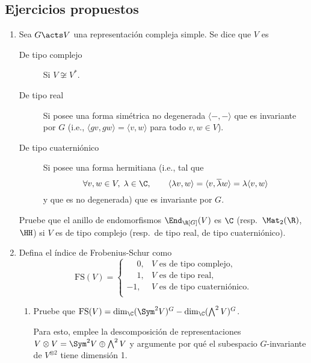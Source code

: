 \documentclass[11pt, reqno]{amsart}
\begin{document}
\begin{additional}
\appendix
\section{Ejercicios propuestos}
\begin{enumerate}
	\item Sea $G \acts V$ una representación compleja simple.
		Se dice que $V$ es
		\begin{description}
			\item[De tipo complejo] Si $V \not\cong V^*$.
			\item[De tipo real] Si posee una forma simétrica no degenerada $\langle -, - \rangle$ que es invariante por $G$
				(i.e., $\langle gv, gw \rangle = \langle v, w \rangle$ para todo $v, w \in V$).
			\item[De tipo cuaterniónico] Si posee una forma hermitiana (i.e., tal que
				\[
					\forall v, w \in V, \; \lambda \in \C, \qquad
					\langle \lambda v, w \rangle = \langle v, \overline{\lambda} w \rangle = \lambda \langle v, w \rangle
				\]
				y que es no degenerada) que es invariante por $G$.
		\end{description}
		Pruebe que el anillo de endomorfismos $\End_{\R[G]}(V)$ es $\C$ (resp.\ $\Mat_2(\R)$, $\HH$) si $V$ es de tipo complejo
		(resp.\ de tipo real, de tipo cuaterniónico).

	\item Defina el índice de Frobenius-Schur como
		\[
			\mathrm{FS}(V) =
			\begin{cases}
				\phantom{-}0, & V\text{ es de tipo complejo,} \\
				\phantom{-}1, & V\text{ es de tipo real,} \\
				-1, & V\text{ es de tipo cuaterniónico.} \\
			\end{cases}
		\]
		\begin{enumerate}
			\item Pruebe que $\mathrm{FS}(V) = \dim_\C (\Sym^2V)^G - \dim_\C(\bigwedge^2 V)^G$.
				\begin{hint}
					Para esto, emplee la descomposición de representaciones $V \otimes V = \Sym^2V \oplus \bigwedge^2 V$
					y argumente por qué el subespacio $G$-invariante de $V^{\otimes 2}$ tiene dimensión 1.
				\end{hint}


\end{enumerate}
\end{enumerate}
\end{additional}
\end{document}
